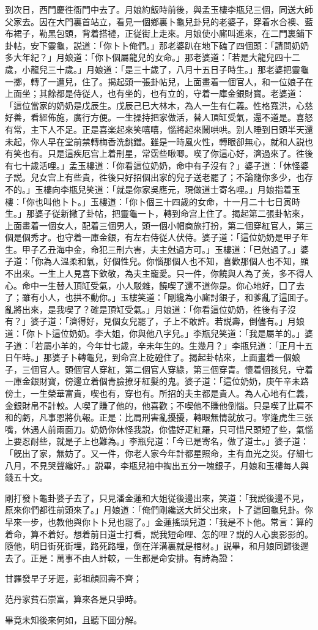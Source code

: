 到次日，西門慶徃衙門中去了。月娘約飯時前後，與孟玉樓李瓶兒三個，同送大師父家去。因在大門裏首站立，看見一個鄉裏卜龜兒卦兒的老婆子，穿着水合襖、藍布裙子，勒黑包頭，背着搭褳，正従街上走來。月娘使小廝叫進來，在二門裏鋪下卦帖，安下靈龜，説道：「你卜卜俺們。」那老婆趴在地下磕了四個頭：「請問奶奶多大年紀？」月娘道：「你卜個屬龍兒的女命。」那老婆道：「若是大龍兒四十二歲，小龍兒三十歲。」月娘道：「是三十歲了，八月十五日子時生。」那老婆把靈龜一擲，轉了一遭兒，住了。揭起頭一張卦帖兒，上面畫着一個官人，和一位娘子在上面坐；其餘都是侍従人，也有坐的，也有立的，守着一庫金銀財寳。老婆道：「這位當家的奶奶是戊辰生。戊辰己巳大林木，為人一生有仁義。性格寬洪，心慈好善，看經佈施，廣行方便。一生操持把家做活，替人頂缸受氣，還不道是。喜怒有常，主下人不足。正是喜楽起來笑嘻嘻，惱將起來鬧哄哄。别人睡到日頭半天還未起，你人早在堂前禁轉梅香洗銚鐺。雖是一時風火性，轉眼卻無心，就和人説也有笑也有。只是這疾厄宫上着刑星，常霑些啾唧。喫了你這心好，濟過來了。徃後有七十歲活哩。」孟玉樓道：「你看這位奶奶，命中有子沒有？」婆子道：「休怪婆子説。兒女宫上有些貴，徃後只好招個出家的兒子送老罷了；不論隨你多少，也存不的。」玉樓向李瓶兒笑道：「就是你家吳應元，現做道士寄名哩。」月娘指着玉樓：「你也叫他卜卜。」玉樓道：「你卜個三十四歲的女命，十一月二十七日寅時生。」那婆子従新撇了卦帖，把靈龜一卜，轉到命宫上住了。揭起第二張卦帖來，上面畫着一個女人，配着三個男人，頭一個小帽商旅打扮，第二個穿紅官人，第三個是個秀才。也守着一庫金銀，有左右侍従人伏侍。婆子道：「這位奶奶是甲子年生。甲子乙丑海中金，命犯三刑六害，夫主尅過方可。」玉樓道：「已尅過了。」婆子道：「你為人溫柔和氣，好個性兒。你惱那個人也不知，喜歡那個人也不知，顯不出來。一生上人見喜下欽敬，為夫主寵愛。只一件，你饒與人為了羙，多不得人心。命中一生替人頂缸受氣，小人駁雜，饒喫了還不道你是。你心地好，囗了去了；雖有小人，也拱不動你。」玉樓笑道：「剛纔為小廝討銀子，和爹亂了這囬子。亂將出來，是我喫了？確是頂缸受氣。」月娘道：「你看這位奶奶，徃後有子沒有？」婆子道：「濟得好，見個女兒罷了，子上不敢許。若説壽，倒儘有。」月娘道：「你卜卜這位奶奶。李大姐，你與他八字兒。」李瓶兒笑道：「我是屬羊的。」婆子道：「若屬小羊的，今年廿七歲，辛未年生的。生幾月？」李瓶兒道：「正月十五日午時。」那婆子卜轉龜兒，到命宫上矻磴住了。揭起卦帖來，上面畫着一個娘子，三個官人。頭個官人穿紅，第二個官人穿綠，第三個穿青。懷着個孩兒，守着一庫金銀財寳，傍邊立着個青臉撩牙紅髮的鬼。婆子道：「這位奶奶，庚午辛未路傍土，一生榮華富貴，喫也有，穿也有。所招的夫主都是貴人。為人心地有仁義，金銀財帛不計較。人喫了賺了他的，他喜歡；不喫他不賺他倒惱。只是喫了比肩不和的虧，凡事恩將仇報。正是：比肩刑害亂擾擾，轉眼無情就放刁。寜逢虎生三张嘴，休遇人前兩面刀。奶奶你休怪我説，你儘好疋紅羅，只可惜尺頭短了些，氣惱上要忍耐些，就是子上也難為。」李瓶兒道：「今已是寄名，做了道士。」婆子道：「旣出了家，無妨了。又一件，你老人家今年計都星照命，主有血光之災。仔細七八月，不見哭聲纔好。」説畢，李瓶兒袖中掏出五分一塊銀子，月娘和玉樓每人與錢五十文。

剛打發卜龜卦婆子去了，只見潘金蓮和大姐従後邊出來，笑道：「我説後邊不見，原來你們都徃前頭來了。」月娘道：「俺們剛纔送大師父出來，卜了這回龜兒卦。你早來一步，也教他與你卜卜兒也罷了。」金蓮搖頭兒道：「我是不卜他。常言：算的着命，算不着好。想着前日道士打看，説我短命哩、怎的哩？説的人心裏影影的。隨他，明日街死街埋，路死路埋，倒在洋溝裏就是棺材。」説畢，和月娘同歸後邊去了。正是：萬事不由人計較，一生都是命安排。有詩為證：

\begin{myquote}
甘羅發早子牙遲，彭祖顔回壽不齊；

范丹家貧石崇富，算來各是只爭時。
\end{myquote}

畢竟未知後來何如，且聽下囬分解。

